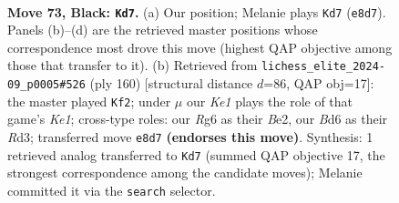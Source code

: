 \documentclass[11pt]{article}
\begin{document}
\begin{figure}[p]\centering
\begin{subfigure}{0.46\textwidth}\centering
\resizebox{\linewidth}{!}{%
\newchessgame
\chessboard[
  setfen={4k3/6p1/p2b2rr/Pppb1p1p/2p2P1P/2B1PNP1/1P3K2/2RR4 b - - 19 73},
  showmover=false,
  pgfstyle=straightmove, color=movearrow, markmove={e8-d7}
]}
\caption{}
\end{subfigure}\hfill
\begin{subfigure}{0.46\textwidth}\centering
\resizebox{\linewidth}{!}{%
\newchessgame
\chessboard[
  setfen={2r5/2kb1p2/4p1pr/1p1pP2p/pP3P2/P1PR2PP/4B3/3RK3 w - - 1 81},
  showmover=false,
  pgfstyle=straightmove, color=movearrow, markmove={e1-f2}
]}
\caption{}
\end{subfigure}
\\[4pt]

\caption{\textbf{Move 73, Black: \texttt{Kd7}.} (a) Our position; Melanie plays \texttt{Kd7} (\texttt{e8d7}). Panels (b)--(d) are the retrieved master positions whose correspondence most drove this move (highest QAP objective among those that transfer to it). (b) Retrieved from \texttt{lichess\_elite\_2024-09\_p0005\#526} (ply 160) [structural distance $d$=86, QAP obj=17]: the master played \texttt{Kf2}; under $\mu$ our \emph{Ke1} plays the role of that game's \emph{Ke1}; cross-type roles: our \emph{R}g6 as their \emph{B}e2, our \emph{B}d6 as their \emph{R}d3; transferred move \texttt{e8d7} \textbf{(endorses this move)}. Synthesis: 1 retrieved analog transferred to \texttt{Kd7} (summed QAP objective 17, the strongest correspondence among the candidate moves); Melanie committed it via the \texttt{search} selector.}
\label{fig:thought-m145}
\end{figure}

\clearpage
\end{document}
